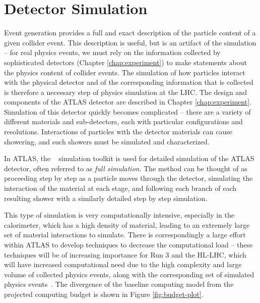 \FloatBarrier
\section{Detector Simulation}
Event generation provides a full and exact description of the particle content of a given collider event. 
This description is useful, but is an artifact of the simulation -- for real physics events, we must rely on 
the information collected by sophisticated detectors (Chapter \ref{chap:experiment}) to make statements about the 
physics content of collider events. The simulation of how particles interact with the physical detector and of
the corresponding information that is collected is therefore a necessary step of physics simulation at the 
LHC. The design and components of the ATLAS detector are described in Chapter \ref{chap:experiment}. 
Simulation of this detector quickly becomes complicated -- there are a variety of different materials and sub-detectors, each with particular configurations and resolutions. Interactions of particles with the detector materials can cause showering, and such showers must be simulated and characterized. 

In ATLAS, the \GEANT~\cite{GEANT4} simulation toolkit is used for detailed simulation of the ATLAS detector, often 
referred to as \emph{full simulation}. The method can be thought of as proceeding step by step as a particle moves 
through the detector, simulating the interaction of the material at each stage, and following each branch of each resulting 
shower with a similarly detailed step by step simulation. 

This type of simulation is very computationally intensive, especially in the calorimeter, which has a high density of 
material, leading to an extremely large set of material interactions to simulate. There is correspondingly a large 
effort within ATLAS to develop techniques to decrease the computational load -- these techniques will be of increasing 
importance for Run 3 and the HL-LHC, which will have increased computational need due to the high complexity and large 
volume of collected physics events, along with the corresponding set of simulated physics events~\cite{HLLHC-compute}. 
The divergence of the baseline computing model from the projected computing budget is shown in Figure \ref{fig:budget-plot}.

